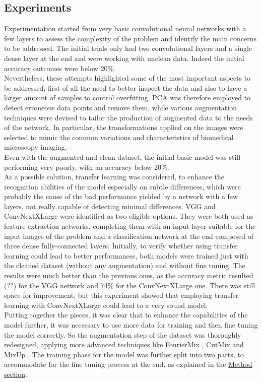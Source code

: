 \documentclass[11pt]{article}
\begin{document}
\begin{multicols}{2}
        \section{Experiments}
		Experimentation started from very basic convolutional neural networks with a few layers to assess the complexity of the problem and identify the main concerns to be addressed. The initial trials only had two convolutional layers and a single dense layer at the end and were working with unclean data. Indeed the initial accuracy outcomes were below 20\%.\\
		Nevertheless, these attempts highlighted some of the most important aspects to be addressed, first of all the need to better inspect the data and also to have a larger amount of samples to control overfitting. PCA \cite{jolliffe2016principal} was therefore employed to detect erroneous data points and remove them, while various augmentation techniques were devised to tailor the production of augmented data to the needs of the network. In particular, the transformations applied on the images were selected to mimic the common variations and characteristics of biomedical microscopy imaging. \\
		Even with the augmented and clean dataset, the initial basic model was still performing very poorly, with an accuracy below 20\%.\\
		As a possible solution, transfer learning was considered, to enhance the recognition abilities of the model especially on subtle differences, which were probably the cause of the bad performance yielded by a network with a few layers, not really capable of detecting minimal differences. VGG and ConvNextXLarge were identified as two eligible options. They were both used as feature extraction networks, completing them with an input layer suitable for the input images of the problem and a classification network at the end composed of three dense fully-connected layers. Initially, to verify whether using transfer learning could lead to better performances, both models were trained just with the cleaned dataset (without any augmentation) and without fine tuning. The results were much better than the previous ones, as the accuracy metric resulted (??) for the VGG network and 74\% for the ConvNextXLarge one. There was still space for improvement, but this experiment showed that employing transfer learning with ConvNextXLarge could lead to a very sound model.\\
		Putting together the pieces, it was clear that to enhance the capabilities of the model further, it was necessary to use more data for training and then fine tuning the model correctly. So the augmentation step of the dataset was thoroughly redesigned, applying more advanced techniques like FourierMix \cite{fouriermix}, CutMix \cite{cutmix} and MixUp \cite{mixup}. The training phase for the model was further split into two parts, to accommodate for the fine tuning process at the end, as explained in the \hyperref[sec:method]{Method section}.\\

\end{multicols}
\end{document}
